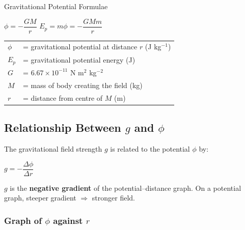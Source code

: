 \documentclass[12pt,a4paper]{article}
\begin{document}
\begin{formulabox}{Gravitational Potential Formulae}
\begin{center}
\Large $\phi = -\dfrac{GM}{r}$ \qquad $E_p = m\phi = -\dfrac{GMm}{r}$
\end{center}
\vspace{0.3em}
\begin{tabular}{@{}ll@{}}
$\phi$ & = gravitational potential at distance $r$ (J kg$^{-1}$) \\
$E_p$ & = gravitational potential energy (J) \\
$G$ & = $6.67 \times 10^{-11}$ N m$^2$ kg$^{-2}$ \\
$M$ & = mass of body creating the field (kg) \\
$r$ & = distance from centre of $M$ (m) \\
\end{tabular}
\end{formulabox}

\subsection{Relationship Between $g$ and $\phi$}

The gravitational field strength $g$ is related to the potential $\phi$ by:

\begin{center}
\large $g = -\dfrac{\Delta\phi}{\Delta r}$
\end{center}

$g$ is the \textbf{negative gradient} of the potential–distance graph. On a potential graph, steeper gradient $\Rightarrow$ stronger field.

\subsubsection*{Graph of $\phi$ against $r$}
\end{document}
